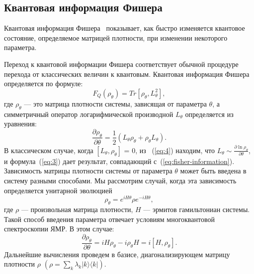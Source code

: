 \subsection{Квантовая информация Фишера}
\label{sec:quantum-fisher-information}
\begin{definition}\label{def:quantum-fisher-information}
  Квантовая информация Фишера~\cite{liu2014} показывает,
  как быстро изменяется квантовое состояние,
  определяемое матрицей плотности, при изменении некоторого параметра.
\end{definition}
Переход к квантовой информации Фишера соответствует обычной процедуре перехода от классических величин к квантовым.
Квантовая информация Фишера определяется по формуле:
%
\begin{equation}
    \label{eq:3}
        F_Q (\rho_\theta) =
            Tr[\rho_\theta, L^2_\theta],
\end{equation}
%
где $\rho_\theta$ --- это матрица плотности системы, зависящая от параметра $\theta$, а симметричный оператор логарифмической производной $L_\theta$ определяется из уравнения:
%
\begin{equation}
    \label{eq:4}
        \frac{\partial\rho_\theta}{\partial\theta} =
            \frac{1}{2}
                \left(L_\theta \rho_\theta +
                \rho_\theta L_\theta
            \right).
\end{equation}
%
В классическом случае, когда $\left[L_\theta, \rho_\theta \right]$ = 0, из ~(\ref{eq:4}) находим,
что ${L_\theta\sim\frac{\partial\ln\rho_\theta}{\partial\theta}}$,
и формула~(\ref{eq:3}) дает результат, совпадающий с~(\ref{eq:fisher-information}).
%
Зависимость матрицы плотности системы от параметра $\theta$ может быть введена в систему разными способами.
Мы рассмотрим случай, когда эта зависимость определяется унитарной эволюцией
%
\begin{equation}
    \label{eq:5}
        \rho_\theta =
            e^{iH\theta}
        \rho e^{-iH\theta},
\end{equation}
%
где $\rho$ --- произвольная матрица плотности, $H$ --- эрмитов гамильтониан системы.
Такой способ введения параметра отвечает условиям многоквантовой спектроскопии ЯМР.
В этом случае:
%
\begin{equation}
    \label{eq:6}
        \frac{\partial\rho_\theta}{\partial\theta} =
            iH\rho_\theta - i\rho_\theta H =
        i \left[H,\rho_\theta \right].
\end{equation}
%
Дальнейшие вычисления проведем в базисе, диагонализирующем матрицу плотности $\rho$ $\left(\rho =\sum\limits_{k} \lambda_k |k\rangle  \langle k| \right)$.
